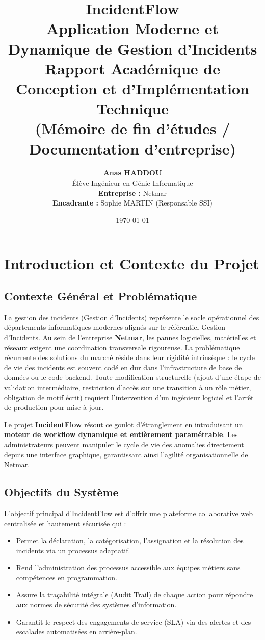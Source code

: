 \documentclass[12pt,a4paper]{article}
\title{
    \vspace{2cm}
    \textbf{\Huge IncidentFlow}\\[0.5cm]
    \Large Application Moderne et Dynamique de Gestion d'Incidents\\[1.5cm]
    \textbf{\Large Rapport Académique de Conception et d'Implémentation Technique \\ (Mémoire de fin d'études / Documentation d'entreprise)}
    \vspace{2cm}
}
\author{
    \textbf{Anas HADDOU} \\
    Élève Ingénieur en Génie Informatique \\[1cm]
    \textbf{Entreprise :} Netmar \\
    \textbf{Encadrante :} Sophie MARTIN (Responsable SSI)
}
\date{\today}
\begin{document}
\maketitle
\thispagestyle{empty}
\clearpage

\tableofcontents
\clearpage

\section{Introduction et Contexte du Projet}

\subsection{Contexte Général et Problématique}
La gestion des incidents (Gestion d'Incidents) représente le socle opérationnel des départements informatiques modernes alignés sur le référentiel Gestion d'Incidents. Au sein de l'entreprise \textbf{Netmar}, les pannes logicielles, matérielles et réseaux exigent une coordination transversale rigoureuse. La problématique récurrente des solutions du marché réside dans leur rigidité intrinsèque : le cycle de vie des incidents est souvent codé en dur dans l'infrastructure de base de données ou le code backend. Toute modification structurelle (ajout d'une étape de validation intermédiaire, restriction d'accès sur une transition à un rôle métier, obligation de motif écrit) requiert l'intervention d'un ingénieur logiciel et l'arrêt de production pour mise à jour.

Le projet \textbf{IncidentFlow} résout ce goulot d'étranglement en introduisant un \textbf{moteur de workflow dynamique et entièrement paramétrable}. Les administrateurs peuvent manipuler le cycle de vie des anomalies directement depuis une interface graphique, garantissant ainsi l'agilité organisationnelle de Netmar.

\subsection{Objectifs du Système}
L'objectif principal d'IncidentFlow est d'offrir une plateforme collaborative web centralisée et hautement sécurisée qui :
\begin{itemize}
    \item Permet la déclaration, la catégorisation, l'assignation et la résolution des incidents via un processus adaptatif.
    \item Rend l'administration des processus accessible aux équipes métiers sans compétences en programmation.
    \item Assure la traçabilité intégrale (Audit Trail) de chaque action pour répondre aux normes de sécurité des systèmes d'information.
    \item Garantit le respect des engagements de service (SLA) via des alertes et des escalades automatisées en arrière-plan.
\end{itemize}
\end{document}
